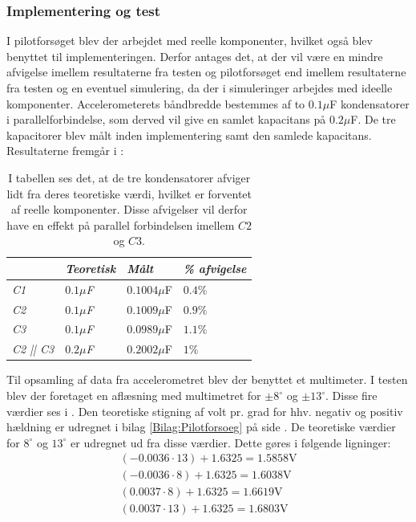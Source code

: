\subsubsection{Implementering og test}
I pilotforsøget blev der arbejdet med reelle komponenter, hvilket også blev benyttet til implementeringen. Derfor antages det, at der vil være en mindre afvigelse imellem resultaterne fra testen og pilotforsøget end imellem resultaterne fra testen og en eventuel simulering, da der i simuleringer arbejdes med ideelle komponenter. Accelerometerets båndbredde bestemmes af to $0.1\mu$F kondensatorer i parallelforbindelse, som derved vil give en samlet kapacitans på  $0.2\mu$F. De tre kapacitorer blev målt inden implementering samt den samlede kapacitans. Resultaterne fremgår i  :
\begin{table}[H]
	\centering
	\begin{tabular}{|l|l|l|l|}\hline
		& \textit{Teoretisk} & \textit{Målt} & \textit{\% afvigelse} \\ \hline
		\textit{C1}       & \textit{$0.1\mu$F} & $0.1004\mu$F  & $0.4\%$               \\ \hline		
		\textit{C2}       & \textit{$0.1\mu$F} & $0.1009\mu$F  & $0.9\%$               \\ \hline
		\textit{C3}       & \textit{$0.1\mu$F} & $0.0989\mu$F  & $1.1\%$               \\ \hline
		\textit{C2 || C3} & \textit{$0.2\mu$F} & $0.2002\mu$F  & $1\%$                \\ \hline
	\end{tabular}
	\caption{I tabellen ses det, at de tre kondensatorer afviger lidt fra deres teoretiske værdi, hvilket er forventet af reelle komponenter. Disse afvigelser vil derfor have en effekt på parallel forbindelsen imellem $C2$ og $C3$.}
	\label{Tab:Acc_kondensator}
\end{table}
\noindent Til opsamling af data fra accelerometret blev der benyttet et multimeter. I testen blev der foretaget en aflæsning med multimetret for $\pm8^\circ$ og $\pm13^\circ$. Disse fire værdier ses i . Den teoretiske stigning af volt pr. grad for hhv. negativ og positiv hældning er udregnet i bilag \ref{Bilag:Pilotforsoeg} på side \pageref{Bilag:Pilotforsoeg}. De teoretiske værdier for $8^\circ$ og $13^\circ$ er udregnet ud fra disse værdier. Dette gøres i følgende ligninger:
\begin{align}
(-0.0036 \cdot 13) + 1.6325 = 1.5858\text{V} \\
(-0.0036 \cdot 8) + 1.6325 = 1.6038\text{V}  \\
(0.0037 \cdot 8) + 1.6325 = 1.6619\text{V}  \\
(0.0037 \cdot 13) + 1.6325 = 1.6803\text{V}
\end{align}
